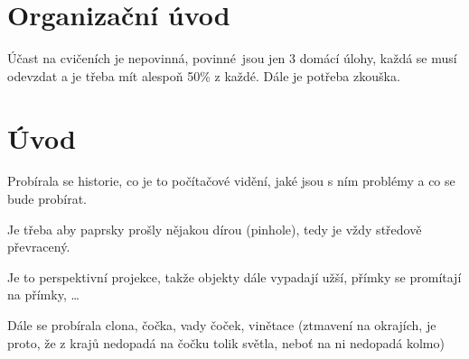 \documentclass[12pt]{article}					%
\begin{document}

\section*{Organizační úvod}
\begin{poznamka}
	Účast na cvičeních je nepovinná, povinné jsou jen 3 domácí úlohy, každá se musí odevzdat a je třeba mít alespoň 50\% z každé. Dále je potřeba zkouška.
\end{poznamka}

\section{Úvod}
\begin{poznamka}
	Probírala se historie, co je to počítačové vidění, jaké jsou s ním problémy a co se bude probírat.
\end{poznamka}


\begin{definice}
	Je třeba aby paprsky prošly nějakou dírou (pinhole), tedy je vždy středově převracený.

	Je to perspektivní projekce, takže objekty dále vypadají užší, přímky se promítají na přímky, …
\end{definice}

\begin{poznamka}
	Dále se probírala clona, čočka, vady čoček, vinětace (ztmavení na okrajích, je proto, že z krajů nedopadá na čočku tolik světla, neboť na ni nedopadá kolmo)
\end{poznamka}
\end{document}
